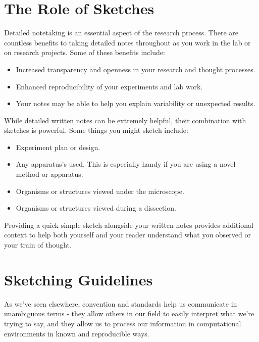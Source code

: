 \documentclass[
]{book}
\providecommand{\tightlist}{%
  \setlength{\itemsep}{0pt}\setlength{\parskip}{0pt}}
\begin{document}
\hypertarget{the-role-of-sketches}{%
\section{The Role of Sketches}\label{the-role-of-sketches}}

Detailed notetaking is an essential aspect of the research process. There are countless benefits to taking detailed notes throughout as you work in the lab or on research projects. Some of these benefits include:

\begin{itemize}
\tightlist
\item
  Increased transparency and openness in your research and thought processes.
\item
  Enhanced reproducibility of your experiments and lab work.
\item
  Your notes may be able to help you explain variability or unexpected results.
\end{itemize}

While detailed written notes can be extremely helpful, their combination with sketches is powerful. Some things you might sketch include:

\begin{itemize}
\tightlist
\item
  Experiment plan or design.
\item
  Any apparatus's used. This is especially handy if you are using a novel method or apparatus.
\item
  Organisms or structures viewed under the microscope.
\item
  Organisms or structures viewed during a dissection.
\end{itemize}

Providing a quick simple sketch alongside your written notes provides additional context to help both yourself and your reader understand what you observed or your train of thought.

\hypertarget{sketching-guidelines}{%
\section{Sketching Guidelines}\label{sketching-guidelines}}

As we've seen elsewhere, convention and standards help us communicate in unambiguous terms - they allow others in our field to easily interpret what we're trying to say, and they allow us to process our information in computational environments in known and reproducible ways.
\end{document}
